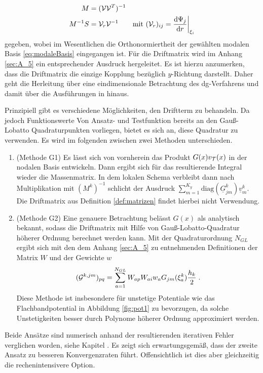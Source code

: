 \begin{align*}
  M &= (\mathcal{V}\mathcal{V}^T)^{-1} \\
  M^{-1}S &= \mathcal{V}_r \mathcal{V}^{-1} \qquad \text{mit } (\mathcal{V}_r)_{ij} = \frac{\mathrm{d}\Psi_j}{\mathrm{d}r}\biggr\rvert_{\xi_i}
\end{align*}
gegeben, wobei im Wesentlichen die Orthonormiertheit der gewählten modalen Basis \eqref{eq:modaleBasis} eingegangen ist. Für die Driftmatrix wird im Anhang \ref{sec:A_5} ein entsprechender Ausdruck hergeleitet. Es ist hierzu anzumerken, dass die Driftmatrix die einzige Kopplung bezüglich $y$-Richtung darstellt. Daher geht die Herleitung über eine eindimensionale Betrachtung des \ac{dg}-Verfahrens und damit über die Ausführungen in \cite{buch} hinaus.

Prinzipiell gibt es verschiedene Möglichkeiten, den Driftterm zu behandeln. Da jedoch Funktionswerte Von Ansatz- und Testfunktion bereits an den Gauß-Lobatto Quadraturpunkten vorliegen, bietet es sich an, diese Quadratur zu verwenden. Es wird im folgenden zwischen zwei Methoden unterschieden.
\begin{enumerate}
  \item (Methode G1) Es lässt sich von vornherein das Produkt $G(x)v_{\mathcal{T}}(x)$ in der nodalen Basis entwickeln. Dann ergibt sich für das resultierende Integral wieder die Massenmatrix. In dem lokalen Schema verbleibt dann nach Multiplikation mit $(M^k)^{-1}$ schlicht der Ausdruck ${\sum_{m=1}^{K_y}\text{diag}(\underline{G}^k_{jm})\underline{v}_m^k}$. Die Driftmatrix aus Definition \ref{def:matrizen} findet hierbei nicht Verwendung.
  \item (Methode G2) Eine genauere Betrachtung belässt $G(x)$ als analytisch bekannt, sodass die Driftmatrix mit Hilfe von Gauß-Lobatto-Quadratur höherer Ordnung berechnet werden kann. Mit der Quadraturordnung $N_{GL}$ ergibt sich mit den dem Anhang \ref{sec:A_5} zu entnehmenden Definitionen der Matrix $W$ und der Gewichte $w$
  \begin{equation}
    (\mathcal{G}^{k,jm})_{pq} = \sum_{a=1}^{N_{GL}} W_{ap} W_{ai} w_a G_{jm}(\xi_a^k)\frac{h_k}{2} \; .
    \label{eq:G_GL}
  \end{equation}
  Diese Methode ist insbesondere für unstetige Potentiale wie das Flachbandpotential in Abbildung \ref{fig:pot1} zu bevorzugen, da solche Unstetigkeiten besser durch Polynome höherer Ordnung approximiert werden.
\end{enumerate}
Beide Ansätze sind numerisch anhand der resultierenden iterativen Fehler verglichen worden, siehe Kapitel . Es zeigt sich erwartungsgemäß, dass der zweite Ansatz zu besseren Konvergenzraten führt. Offensichtlich ist dies aber gleichzeitig die rechenintensivere Option.


